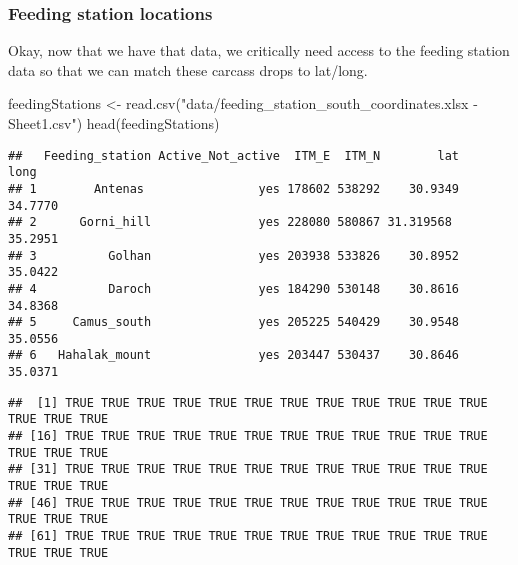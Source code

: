 \documentclass[
]{article}
\newenvironment{Shaded}{\begin{snugshade}}{\end{snugshade}}
\newcommand{\CommentTok}[1]{\textcolor[rgb]{0.56,0.35,0.01}{\textit{#1}}}
\newcommand{\FunctionTok}[1]{\textcolor[rgb]{0.00,0.00,0.00}{#1}}
\newcommand{\NormalTok}[1]{#1}
\newcommand{\OtherTok}[1]{\textcolor[rgb]{0.56,0.35,0.01}{#1}}
\newcommand{\SpecialCharTok}[1]{\textcolor[rgb]{0.00,0.00,0.00}{#1}}
\newcommand{\StringTok}[1]{\textcolor[rgb]{0.31,0.60,0.02}{#1}}
\begin{document}
\hypertarget{feeding-station-locations}{%
\subsubsection{Feeding station
locations}\label{feeding-station-locations}}

Okay, now that we have that data, we critically need access to the
feeding station data so that we can match these carcass drops to
lat/long.

\begin{Shaded}
\begin{Highlighting}[]
\NormalTok{feedingStations }\OtherTok{\textless{}{-}} \FunctionTok{read.csv}\NormalTok{(}\StringTok{"data/feeding\_station\_south\_coordinates.xlsx {-} Sheet1.csv"}\NormalTok{)}
\FunctionTok{head}\NormalTok{(feedingStations)}
\end{Highlighting}
\end{Shaded}

\begin{verbatim}
##   Feeding_station Active_Not_active  ITM_E  ITM_N        lat    long
## 1        Antenas                yes 178602 538292    30.9349 34.7770
## 2      Gorni_hill               yes 228080 580867 31.319568  35.2951
## 3          Golhan               yes 203938 533826    30.8952 35.0422
## 4          Daroch               yes 184290 530148    30.8616 34.8368
## 5     Camus_south               yes 205225 540429    30.9548 35.0556
## 6   Hahalak_mount               yes 203447 530437    30.8646 35.0371
\end{verbatim}

\begin{Shaded}
\end{Shaded}

\begin{verbatim}
##  [1] TRUE TRUE TRUE TRUE TRUE TRUE TRUE TRUE TRUE TRUE TRUE TRUE TRUE TRUE TRUE
## [16] TRUE TRUE TRUE TRUE TRUE TRUE TRUE TRUE TRUE TRUE TRUE TRUE TRUE TRUE TRUE
## [31] TRUE TRUE TRUE TRUE TRUE TRUE TRUE TRUE TRUE TRUE TRUE TRUE TRUE TRUE TRUE
## [46] TRUE TRUE TRUE TRUE TRUE TRUE TRUE TRUE TRUE TRUE TRUE TRUE TRUE TRUE TRUE
## [61] TRUE TRUE TRUE TRUE TRUE TRUE TRUE TRUE TRUE TRUE TRUE TRUE TRUE TRUE TRUE
\end{verbatim}
\end{document}
